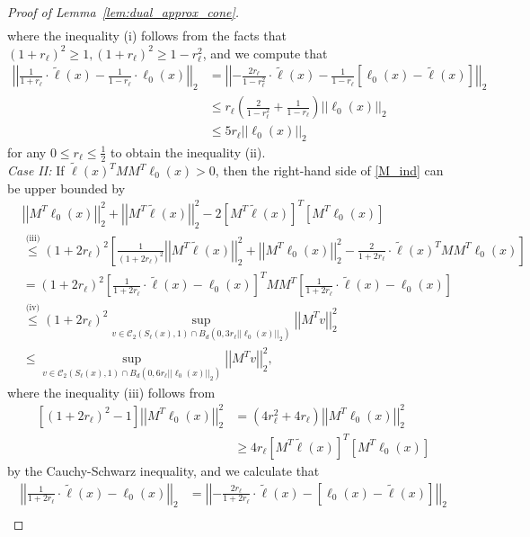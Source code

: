 \documentclass[ejsv2,noshowframe]{imsart}
\theoremstyle{plain}
\theoremstyle{definition}
\theoremstyle{remark}
\newcommand{\norm}[1]{\left|\left| #1 \right|\right|}
\renewcommand{\tilde}{\widetilde}
\begin{document}
\begin{proof}[Proof of Lemma~\ref{lem:dual_approx_cone}]
\begin{align*}
	\end{align*}
	where the inequality (i) follows from the facts that $(1+r_{\ell})^2 \geq 1, (1+r_{\ell})^2 \geq 1-r_{\ell}^2$, and we compute that
	\begin{align*}
		\norm{\frac{1}{1+r_{\ell}} \cdot \tilde{\ell}(x) - \frac{1}{1-r_{\ell}} \cdot \ell_0(x)}_2 &= \norm{-\frac{2r_{\ell}}{1-r_{\ell}^2} \cdot \tilde{\ell}(x) - \frac{1}{1-r_{\ell}}\left[\ell_0(x) -\tilde{\ell}(x)\right]}_2\\
		&\leq r_{\ell}\left(\frac{2}{1-r_{\ell}^2} + \frac{1}{1-r_{\ell}} \right)\norm{\ell_0(x)}_2\\
		&\leq 5r_{\ell} \norm{\ell_0(x)}_2
	\end{align*}
	for any $0\leq r_{\ell} \leq \frac{1}{2}$ to obtain the inequality (ii).\\
	\emph{Case II:} If $\tilde{\ell}(x)^T MM^T \ell_0(x) > 0$, then the right-hand side of \eqref{M_ind}  can be upper bounded by
	\begin{align*}
		&\norm{M^T\ell_0(x)}_2^2 + \norm{M^T \tilde{\ell}(x)}_2^2 - 2\left[M^T\tilde{\ell}(x)\right]^T\left[M^T\ell_0(x)\right] \\
		&\stackrel{\text{(iii)}}{\leq} (1+2r_{\ell})^2\left[ \frac{1}{(1+2r_{\ell})^2}\norm{M^T\tilde{\ell}(x)}_2^2 + \norm{M^T\ell_0(x)}_2^2 - \frac{2}{1+2r_{\ell}} \cdot \tilde{\ell}(x)^T MM^T \ell_0(x)\right]\\
		&= (1+2r_{\ell})^2 \left[\frac{1}{1+2r_{\ell}} \cdot \tilde{\ell}(x) -  \ell_0(x)\right]^T MM^T \left[\frac{1}{1+2r_{\ell}} \cdot \tilde{\ell}(x) - \ell_0(x)\right]\\
		&\stackrel{\text{(iv)}}{\leq} (1+2r_{\ell})^2 \sup_{v\in \mathcal{C}_2(S_{\ell}(x),1) \cap B_d\left(0,3r_{\ell}\norm{\ell_0(x)}_2\right)} \norm{M^Tv}_2^2\\
		&\leq \sup_{v\in \mathcal{C}_2(S_{\ell}(x),1) \cap B_d\left(0,6r_{\ell}\norm{\ell_0(x)}_2\right)} \norm{M^Tv}_2^2,
	\end{align*}
	where the inequality (iii) follows from 
	\begin{align*}
		\left[(1+2r_{\ell})^2 - 1\right] \norm{M^T\ell_0(x)}_2^2 &= (4r_{\ell}^2 + 4r_{\ell}) \norm{M^T\ell_0(x)}_2^2\\
		&\geq 4r_{\ell} \left[M^T\tilde{\ell}(x)\right]^T\left[M^T\ell_0(x)\right]
	\end{align*}
		by the Cauchy-Schwarz inequality, and we calculate that
	\begin{align*}
		\norm{\frac{1}{1+2r_{\ell}} \cdot \tilde{\ell}(x) - \ell_0(x)}_2 &= \norm{-\frac{2r_{\ell}}{1+2r_{\ell}} \cdot \tilde{\ell}(x) - \left[\ell_0(x) -\tilde{\ell}(x)\right]}_2\\

\end{align*}
\end{proof}
\end{document}
